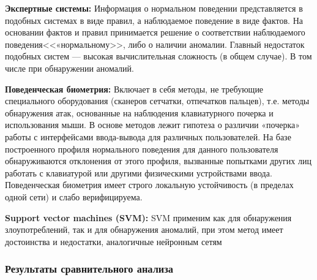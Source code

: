 \textbf{Экспертные системы:} Информация о нормальном поведении представляется в подобных системах в виде правил, а наблюдаемое поведение в виде фактов. На основании фактов и правил принимается решение о соответствии наблюдаемого поведения<<«нормальному>>, либо о наличии аномалии. Главный недостаток подобных систем --- высокая вычислительная сложность (в общем случае). В том числе при обнаружении аномалий. 

\textbf{Поведенческая биометрия:} Включает в себя методы, не требующие специального оборудования (сканеров сетчатки, отпечатков пальцев), т.е. методы обнаружения атак, основанные на наблюдения клавиатурного почерка и использования мыши. В основе методов лежит гипотеза о различии «почерка» работы с интерфейсами ввода-вывода для различных пользователей. На базе построенного профиля нормального поведения для данного пользователя обнаруживаются отклонения от этого профиля, вызванные попытками других лиц работать с клавиатурой или другими физическими устройствами ввода. Поведенческая биометрия имеет строго локальную устойчивость (в пределах одной сети) и слабо верифицируема.

\textbf{Support vector machines (SVM):} SVM применим как для обнаружения злоупотреблений, так и для обнаружения аномалий, при этом метод имеет достоинства и недостатки, аналогичные нейронным сетям

\newcommand{\specialcell}[2][c]{%
  \begin{tabular}[#1]{@{}c@{}}#2\end{tabular}}

\subsubsection{Результаты сравнительного анализа}

